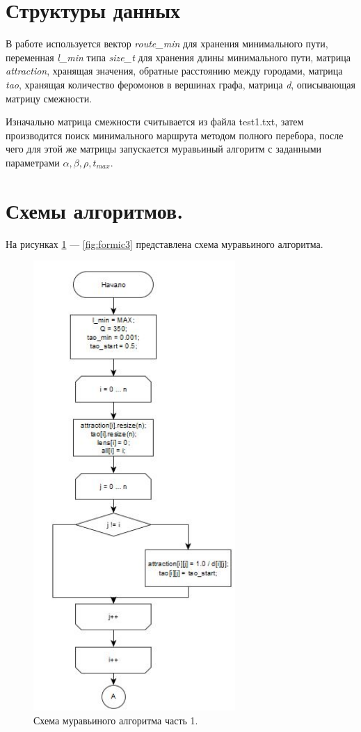 \documentclass[12pt]{report}
\begin{document}
	\section{Структуры данных}
	В работе используется вектор \textit{route\_min} для хранения минимального пути, переменная \textit{l\_min} типа \textit{size\_t} для хранения длины минимального пути, матрица \textit{attraction}, хранящая значения, обратные расстоянию между городами, матрица \textit{tao}, хранящая количество феромонов в вершинах графа, матрица \textit{d}, описывающая матрицу смежности.
	
	Изначально матрица смежности считывается из файла test1.txt, затем производится поиск минимального маршрута методом полного перебора, после чего для этой же матрицы запускается муравьиный алгоритм с заданными параметрами $\alpha, \beta, \rho, t_{max}$.
	
	\section{Схемы алгоритмов.}
	
	На рисунках \ref{fig:formic1} --- \ref{fig:formic3} представлена схема муравьиного алгоритма.
	
	\begin{figure}[H]
		\begin{center}
			\includegraphics[scale=1]{img/formic.png}
			\caption{Схема муравьиного алгоритма часть 1.}
			\label{fig:formic1}
		\end{center}
	\end{figure}
	
\end{document}
